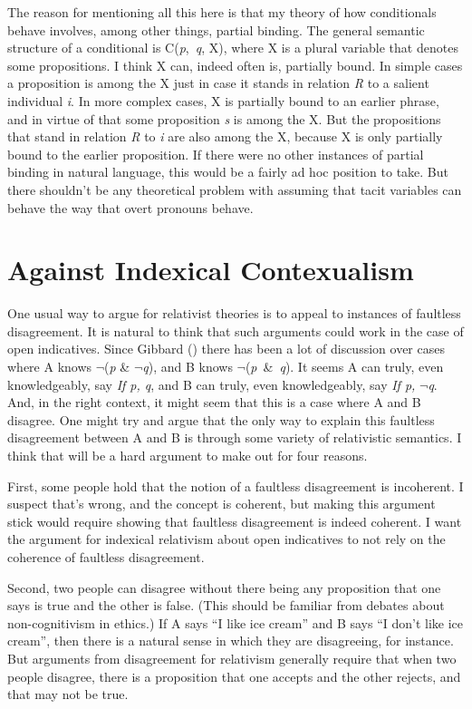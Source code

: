 \documentclass[
  11pt,
  letterpaper,
  DIV=11,
  numbers=noendperiod,
  oneside]{scrartcl}
\begin{document}
The reason for mentioning all this here is that my theory of how
conditionals behave involves, among other things, partial binding. The
general semantic structure of a conditional is C(\emph{p},~\emph{q}, X),
where X is a plural variable that denotes some propositions. I think X
can, indeed often is, partially bound. In simple cases a proposition is
among the X just in case it stands in relation \emph{R} to a salient
individual \emph{i}. In more complex cases, X is partially bound to an
earlier phrase, and in virtue of that some proposition \emph{s} is among
the X. But the propositions that stand in relation \emph{R} to \emph{i}
are also among the X, because X is only partially bound to the earlier
proposition. If there were no other instances of partial binding in
natural language, this would be a fairly ad hoc position to take. But
there shouldn't be any theoretical problem with assuming that tacit
variables can behave the way that overt pronouns behave.

\section{Against Indexical
Contexualism}\label{against-indexical-contexualism}

One usual way to argue for relativist theories is to appeal to instances
of faultless disagreement. It is natural to think that such arguments
could work in the case of open indicatives. Since Gibbard
() there has been a lot of discussion
over cases where A knows \(\neg\)(\emph{p} \& \(\neg\)\emph{q}), and B
knows \(\neg\)(\emph{p}~\&~\emph{q}). It seems A can truly, even
knowledgeably, say \emph{If p, q}, and B can truly, even knowledgeably,
say \emph{If p,} \(\neg\)\emph{q}. And, in the right context, it might
seem that this is a case where A and B disagree. One might try and argue
that the only way to explain this faultless disagreement between A and B
is through some variety of relativistic semantics. I think that will be
a hard argument to make out for four reasons.

First, some people hold that the notion of a faultless disagreement is
incoherent. I suspect that's wrong, and the concept is coherent, but
making this argument stick would require showing that faultless
disagreement is indeed coherent. I want the argument for indexical
relativism about open indicatives to not rely on the coherence of
faultless disagreement.

Second, two people can disagree without there being any proposition that
one says is true and the other is false. (This should be familiar from
debates about non-cognitivism in ethics.) If A says ``I like ice cream''
and B says ``I don't like ice cream'', then there is a natural sense in
which they are disagreeing, for instance. But arguments from
disagreement for relativism generally require that when two people
disagree, there is a proposition that one accepts and the other rejects,
and that may not be true.
\end{document}
